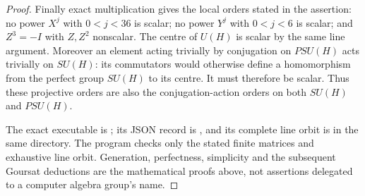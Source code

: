 \begin{proof}
Finally exact multiplication gives the local orders stated in
the assertion: no power $X^j$ with $0<j<36$ is scalar; no power
$Y^j$ with $0<j<6$ is scalar; and $Z^3=-I$ with $Z,Z^2$
nonscalar.  The centre of $U(H)$ is scalar by the same line
argument.  Moreover an element acting trivially by conjugation
on $PSU(H)$ acts trivially on $SU(H)$: its commutators would
otherwise define a homomorphism from the perfect group
$SU(H)$ to its centre.  It must therefore be scalar.
Thus these projective orders are also the conjugation-action
orders on both $SU(H)$ and $PSU(H)$.

The exact executable is
; its
JSON record is , and its
complete line orbit is 
in the same directory.  The program checks only the stated
finite matrices and exhaustive line orbit.  Generation,
perfectness, simplicity and the subsequent Goursat deductions
are the mathematical proofs above, not assertions delegated
to a computer algebra group's name.
\end{proof}
